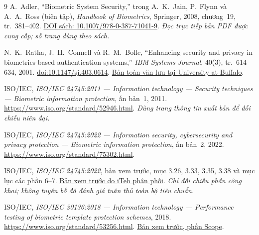 \documentclass[11pt,a4paper]{article}
\begin{document}
\begin{thebibliography}{9}
\small
{}
A.~Adler, ``Biometric System Security,'' trong A.~K.~Jain, P.~Flynn và A.~A.~Ross (biên tập), \textit{Handbook of Biometrics}, Springer, 2008, chương~19, tr.~381--402.
\href{https://doi.org/10.1007/978-0-387-71041-9}{DOI sách: 10.1007/978-0-387-71041-9}.
\textit{Đọc trực tiếp bản PDF được cung cấp; số trang dùng theo sách.}

N.~K.~Ratha, J.~H.~Connell và R.~M.~Bolle, ``Enhancing security and privacy in biometrics-based authentication systems,'' \textit{IBM Systems Journal}, 40(3), tr.~614--634, 2001.
\href{https://doi.org/10.1147/sj.403.0614}{doi:10.1147/sj.403.0614}.
\href{https://cedar.buffalo.edu/~govind/CSE717/papers/CancelableBiometrics.pdf}{Bản toàn văn lưu tại University at Buffalo}.

ISO/IEC, \textit{ISO/IEC 24745:2011 --- Information technology --- Security techniques --- Biometric information protection}, ấn bản~1, 2011.
\url{https://www.iso.org/standard/52946.html}.
\textit{Dùng trang thông tin xuất bản để đối chiếu niên đại.}

ISO/IEC, \textit{ISO/IEC 24745:2022 --- Information security, cybersecurity and privacy protection --- Biometric information protection}, ấn bản~2, 2022.
\url{https://www.iso.org/standard/75302.html}.

ISO/IEC, \textit{ISO/IEC 24745:2022}, bản xem trước, mục 3.26, 3.33, 3.35, 3.38 và mục lục các phần 6--7.
\href{https://cdn.standards.iteh.ai/samples/75302/c33df95b15cc47ddb401b17bd3807ee4/ISO-IEC-24745-2022.pdf}{Bản xem trước do iTeh phân phối}.
\textit{Chỉ đối chiếu phần công khai; không tuyên bố đã đánh giá tuân thủ toàn bộ tiêu chuẩn.}

ISO/IEC, \textit{ISO/IEC 30136:2018 --- Information technology --- Performance testing of biometric template protection schemes}, 2018.
\url{https://www.iso.org/standard/53256.html}.
\href{https://cdn.standards.iteh.ai/sist-preview/53256/e8b2657f0df544f586cd382bde0c39db/ISO-IEC-30136-2018.pdf}{Bản xem trước, phần Scope}.
\end{thebibliography}
\end{document}
